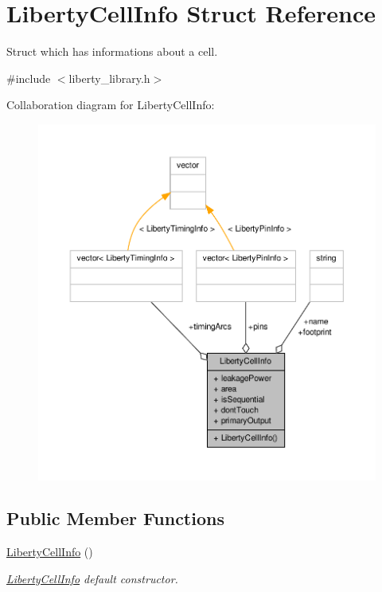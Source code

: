 \hypertarget{structLibertyCellInfo}{\section{Liberty\-Cell\-Info Struct Reference}
\label{structLibertyCellInfo}
}


Struct which has informations about a cell.  




{\ttfamily \#include $<$liberty\-\_\-library.\-h$>$}



Collaboration diagram for Liberty\-Cell\-Info\-:\nopagebreak
\begin{figure}[H]
\begin{center}
\leavevmode
\includegraphics[width=350pt]{structLibertyCellInfo__coll__graph}
\end{center}
\end{figure}
\subsection*{Public Member Functions}
\begin{DoxyCompactItemize}
\item 
\hyperlink{structLibertyCellInfo_a3250ab70b0c778ef0881b949c008814b}{Liberty\-Cell\-Info} ()
\begin{DoxyCompactList}\small\item\em \hyperlink{structLibertyCellInfo}{Liberty\-Cell\-Info} default constructor. \end{DoxyCompactList}\end{DoxyCompactItemize}
